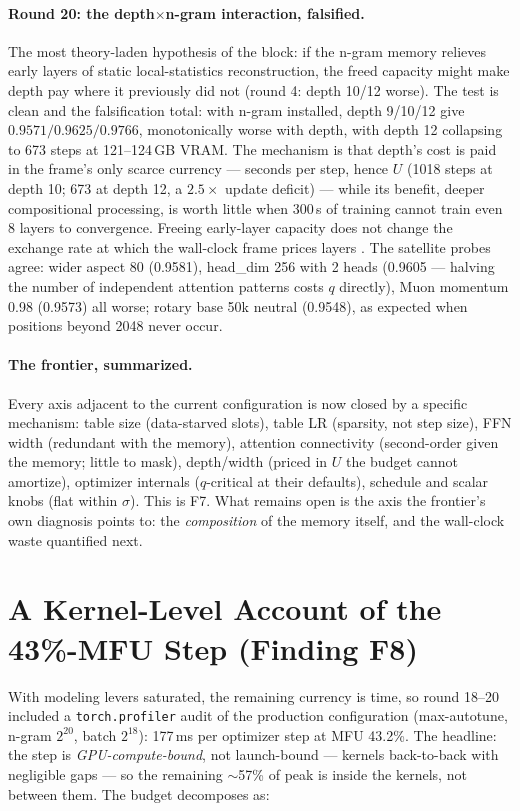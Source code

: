 \documentclass{article}
\begin{document}
\paragraph{Round 20: the depth$\times$n-gram interaction, falsified.}
The most theory-laden hypothesis of the block: if the n-gram memory relieves early layers of static local-statistics reconstruction, the freed capacity might make depth pay where it previously did not (round 4: depth 10/12 worse). The test is clean and the falsification total: with n-gram installed, depth 9/10/12 give $0.9571/0.9625/0.9766$, monotonically worse with depth, with depth 12 collapsing to 673 steps at 121--124\,GB VRAM. The mechanism is that depth's cost is paid in the frame's only scarce currency --- seconds per step, hence $U$ (1018 steps at depth 10; 673 at depth 12, a $2.5\times$ update deficit) --- while its benefit, deeper compositional processing, is worth little when 300\,s of training cannot train even 8 layers to convergence. Freeing early-layer capacity does not change the exchange rate at which the wall-clock frame prices layers \cite{hoffmann2022chinchilla}. The satellite probes agree: wider aspect 80 (0.9581), head\_dim 256 with 2 heads (0.9605 --- halving the number of independent attention patterns costs $q$ directly), Muon momentum 0.98 (0.9573) all worse; rotary base 50k neutral (0.9548), as expected when positions beyond 2048 never occur.

\paragraph{The frontier, summarized.} Every axis adjacent to the current configuration is now closed by a specific mechanism: table size (data-starved slots), table LR (sparsity, not step size), FFN width (redundant with the memory), attention connectivity (second-order given the memory; little to mask), depth/width (priced in $U$ the budget cannot amortize), optimizer internals ($q$-critical at their defaults), schedule and scalar knobs (flat within $\sigma$). This is F7. What remains open is the axis the frontier's own diagnosis points to: the \emph{composition} of the memory itself, and the wall-clock waste quantified next.

\section{A Kernel-Level Account of the 43\%-MFU Step (Finding F8)}
\label{sec:kernel}

With modeling levers saturated, the remaining currency is time, so round 18--20 included a \texttt{torch.profiler} audit of the production configuration (max-autotune, n-gram $2^{20}$, batch $2^{18}$): 177\,ms per optimizer step at MFU 43.2\%. The headline: the step is \emph{GPU-compute-bound}, not launch-bound --- kernels back-to-back with negligible gaps --- so the remaining $\sim$57\% of peak is inside the kernels, not between them. The budget decomposes as:
\end{document}
